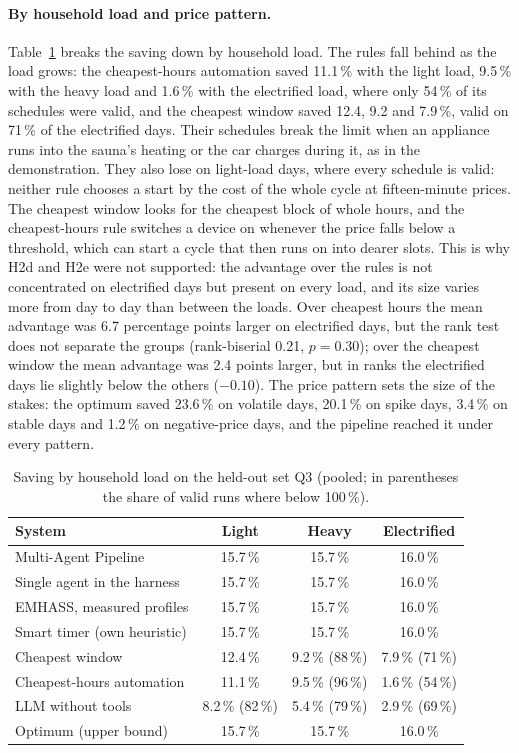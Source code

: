 \documentclass[12pt,a4paper]{report}
\begin{document}
\paragraph{By household load and price pattern.}
Table~\ref{tab:q3-conditions} breaks the saving down by household load.
The rules fall behind as the load grows: the cheapest-hours automation
saved 11.1\,\% with the light load, 9.5\,\% with the heavy load and
1.6\,\% with the electrified load, where only 54\,\% of its schedules
were valid, and the cheapest window saved 12.4, 9.2 and 7.9\,\%, valid
on 71\,\% of the electrified days. Their schedules break the limit when
an appliance runs into the sauna's heating or the car charges during it,
as in the demonstration. They also lose on light-load days, where every
schedule is valid: neither rule chooses a start by the cost of the whole
cycle at fifteen-minute prices. The cheapest window looks for the
cheapest block of whole hours, and the cheapest-hours rule switches a
device on whenever the price falls below a threshold, which can start a
cycle that then runs on into dearer slots. This is why H2d and H2e were
not supported: the advantage over
the rules is not concentrated on electrified days but present on every
load, and its size varies more from day to day than between the loads.
Over cheapest hours the mean advantage was 6.7 percentage points larger
on electrified days, but the rank test does not separate the groups
(rank-biserial 0.21, $p = 0.30$); over the cheapest window the mean
advantage was 2.4 points larger, but in ranks the electrified days lie
slightly below the others ($-0.10$). The price pattern sets the size of
the stakes: the optimum saved 23.6\,\% on volatile days, 20.1\,\% on
spike days, 3.4\,\% on stable days and 1.2\,\% on negative-price days,
and the pipeline reached it under every pattern.

\begin{table}[h!]
\caption{Saving by household load on the held-out set Q3 (pooled; in parentheses the share of valid runs where below 100\,\%).}
\label{tab:q3-conditions}
\small
\begin{tabular*}{\textwidth}{@{\extracolsep{\fill}}lccc}
\toprule
System & Light & Heavy & Electrified \\
\midrule
Multi-Agent Pipeline & 15.7\,\% & 15.7\,\% & 16.0\,\% \\
Single agent in the harness & 15.7\,\% & 15.7\,\% & 16.0\,\% \\
EMHASS, measured profiles & 15.7\,\% & 15.7\,\% & 16.0\,\% \\
Smart timer (own heuristic) & 15.7\,\% & 15.7\,\% & 16.0\,\% \\
Cheapest window & 12.4\,\% & 9.2\,\% (88\,\%) & 7.9\,\% (71\,\%) \\
Cheapest-hours automation & 11.1\,\% & 9.5\,\% (96\,\%) & 1.6\,\% (54\,\%) \\
LLM without tools & 8.2\,\% (82\,\%) & 5.4\,\% (79\,\%) & 2.9\,\% (69\,\%) \\
\midrule
Optimum (upper bound) & 15.7\,\% & 15.7\,\% & 16.0\,\% \\
\bottomrule
\end{tabular*}
\end{table}
\end{document}

